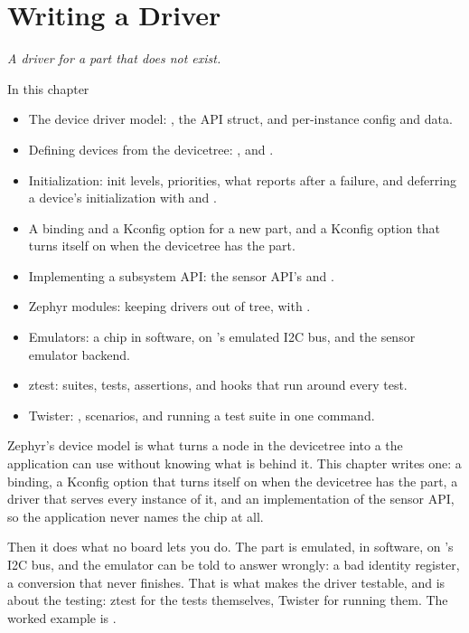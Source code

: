 
\chapter{Writing a Driver}
\label{c5:ch:driver}\label{c5:ch}

{\large\itshape A driver for a part that does not exist.\par}

\begin{chapterbox}{In this chapter}
\begin{itemize}
  \item The device driver model: , the API struct, and per-instance config and data.
  \item Defining devices from the devicetree: ,  and
    .
  \item Initialization: init levels, priorities, what  reports after a failure, and
    deferring a device’s initialization with  and .
  \item A binding and a Kconfig option for a new part, and a Kconfig option that turns itself on when the
    devicetree has the part.
  \item Implementing a subsystem API: the sensor API’s  and .
  \item Zephyr modules: keeping drivers out of tree, with .
  \item Emulators: a chip in software, on ’s emulated I2C bus, and the sensor emulator
    backend.
  \item ztest: suites, tests, assertions, and hooks that run around every test.
  \item Twister: , scenarios, and running a test suite in one command.
\end{itemize}
\end{chapterbox}

Zephyr's device model is what turns a node in the devicetree into a  the
application can use without knowing what is behind it. This chapter writes one: a binding, a Kconfig
option that turns itself on when the devicetree has the part, a driver that serves every instance of
it, and an implementation of the sensor API, so the application never names the chip at all.

Then it does what no board lets you do. The part is emulated, in software, on 's
I2C bus, and the emulator can be told to answer wrongly: a bad identity register, a conversion that
never finishes. That is what makes the driver testable, and  is about the testing:
ztest for the tests themselves, Twister for running them. The worked example is
.





